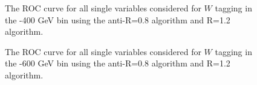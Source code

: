 \begin{figure}
\centering
{}
\caption{The ROC curve for all single variables considered for $W$
tagging in the -400 GeV bin using the anti-\kT R=0.8 algorithm and R=1.2 algorithm.}
\label{fig:pt300_single}
\end{figure}


\begin{figure}
\centering
{}
\caption{The ROC curve for all single variables considered for $W$
tagging in the -600 GeV bin using the anti-\kT R=0.8 algorithm and R=1.2 algorithm.}
\label{fig:pt500_single}
\end{figure}

